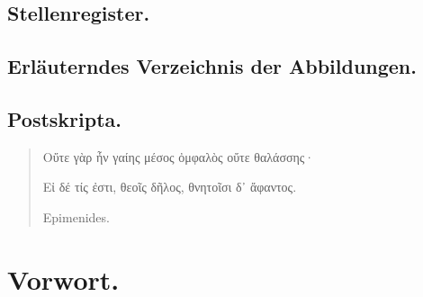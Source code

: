 \documentclass[a4paper, 11pt, oneside]{article}
\begin{document}
\subsection*{Stellenregister.}

\subsection*{Erläuterndes Verzeichnis der Abbildungen.}

\subsection*{Postskripta.}
\clearpage
\begin{quotation}
\begin{flushright}
Οὔτε γὰρ ἦν γαίης μέσος ὀμφαλὸς οὔτε θαλάσσης·

Εἰ δέ τίς ἐστι, θεοῖς δῆλος, θνητοῖσι δ᾽ ἄφαντος.\hspace*{1em}

Epimenides.
\end{flushright}
\end{quotation}
\section*{Vorwort.}
\end{document}
